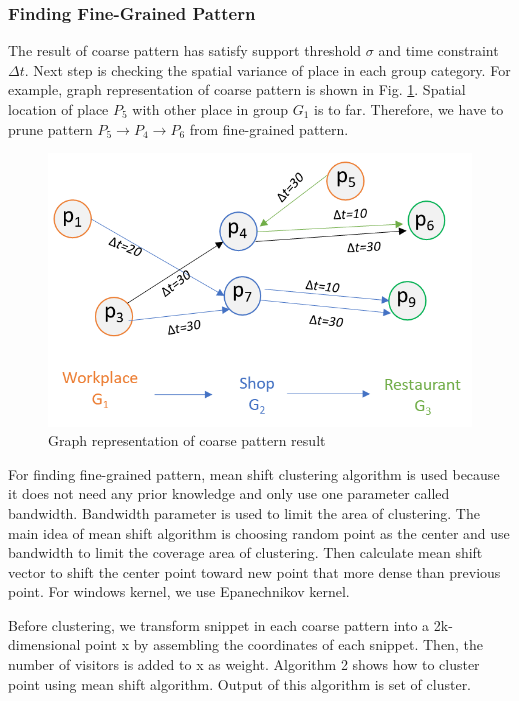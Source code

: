 \documentclass[conference]{IEEEtran}
\begin{document}
\subsubsection{Finding Fine-Grained Pattern}
The result of coarse pattern has satisfy support threshold $\sigma$ and time constraint $\Delta t$. Next step is checking the spatial variance of place in each group category. For example, graph representation of coarse pattern is shown in Fig. \ref{fig:graph-coarse-pattern}. Spatial location of place $P_{5}$ with other place in group $G_{1}$ is to far. Therefore, we have to prune pattern $P_{5}\rightarrow P_{4}\rightarrow P_{6}$ from fine-grained pattern. 

\begin{figure}[!h]
	\centering
	\includegraphics[width=1\linewidth]{graph_coarse_pattern}
	\caption{Graph representation of coarse pattern result}
	\label{fig:graph-coarse-pattern}
\end{figure}

For finding fine-grained pattern, mean shift clustering algorithm is used because it does not need any prior knowledge and only use one parameter called bandwidth. Bandwidth parameter is used to limit the area of clustering. The main idea of mean shift algorithm is choosing random point as the center and use bandwidth to limit the coverage area of clustering. Then calculate mean shift vector to shift the center point toward new point that more dense than previous point. For windows kernel, we use Epanechnikov kernel. 
\par
Before clustering, we transform snippet in each coarse pattern into a 2k-dimensional point x by assembling the coordinates of each snippet. Then, the number of visitors is added to x as weight. Algorithm 2 shows how to cluster point using mean shift algorithm. Output of this algorithm is set of cluster.
\end{document}
